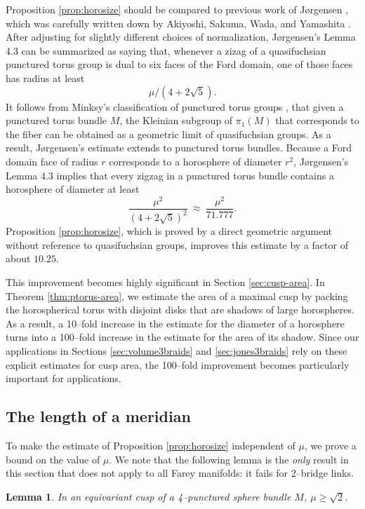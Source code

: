 \documentclass[11pt]{amsart}
\theoremstyle{plain}
\newtheorem{lemma}[theorem]{Lemma}
\theoremstyle{definition}
\begin{document}
Proposition \ref{prop:horosize} should be compared to previous work of
J{\o}rgensen \cite[Lemma 4.3]{jorgensen}, which was carefully written
down by Akiyoshi, Sakuma, Wada, and Yamashita \cite[Lemma
8.1.1]{aswy-book}.  After adjusting for slightly different choices of
normalization, J{\o}rgensen's Lemma 4.3 can be summarized as saying
that, whenever a zizag of a quasifuchsian punctured torus group is dual 
to six faces of the Ford domain, one of those faces has radius at least 
$$\mu/(4+2\sqrt{5}).$$
%
It follows from Minksy's classification of punctured torus groups
\cite{minsky}, that given a punctured torus bundle $M$, the Kleinian
subgroup of $\pi_1(M)$ that corresponds to the fiber can be obtained
as a geometric limit of quasifuchsian groups.  As a result,
J{\o}rgensen's estimate extends to punctured torus bundles.  Because a
Ford domain face of radius $r$ corresponds to a horosphere of diameter
$r^2$, J{\o}rgensen's Lemma 4.3 implies that every zigzag in a
punctured torus bundle contains a horosphere of diameter at least
$$\frac{\mu^2}{(4+2\sqrt{5})^2} \: \approx \: \frac{\mu^2}{71.777}.$$
Proposition \ref{prop:horosize}, which is proved by a direct geometric
argument without reference to quasifuchsian groups, improves this
estimate by a factor of about $10.25$.


This improvement becomes highly significant in Section
\ref{sec:cusp-area}.  In Theorem \ref{thm:ptorus-area}, we estimate
the area of a maximal cusp by packing the horospherical torus with
disjoint disks that are shadows of large horospheres.  As a result, a
10--fold increase in the estimate for the diameter of a horosphere
turns into a 100--fold increase in the estimate for the area of its
shadow.
Since our applications in Sections \ref{sec:volume3braids} and
\ref{sec:jones3braids} rely on these explicit estimates for cusp area,
the 100--fold improvement becomes particularly important for
applications.  

\subsection{The length of a meridian}

To make the estimate of Proposition \ref{prop:horosize} independent of
$\mu$, we prove a bound on the value of $\mu$.  We note that the
following lemma is the \emph{only} result in this section that does
not apply to all Farey manifolds: it fails for 2--bridge links.

\begin{lemma}
In an equivariant cusp of a 4--punctured sphere bundle $M$, $\mu \geq
\sqrt{2}$.
\label{lemma:meridian}
\end{lemma}
\end{document}
